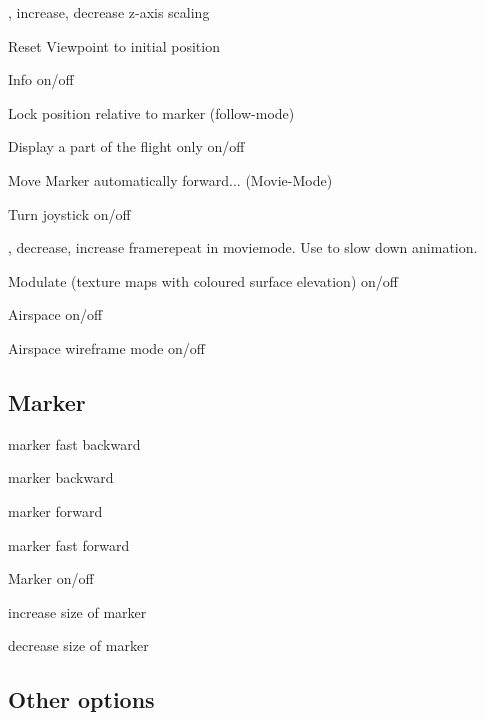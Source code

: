 \begin{hkkeys}
\item[\keys{{+}}, \keys{--}]      increase, decrease z-axis scaling

\item[\keys{F5}]       Reset Viewpoint to initial position
\item[\keys{F6}]       Info on/off

\item[\keys{M}]        Lock position relative to marker (follow-mode)
\item[\keys{U}]        Display a part of the flight only  on/off
\item[\keys{I}]        Move Marker automatically forward... (Movie-Mode)
\item[\keys{J}]        Turn joystick on/off

\item[\keys{\shift+F1}, \keys{\shift+F2}]
        decrease, increase framerepeat  in moviemode. Use to slow down animation.

\item[\keys{F8}]       Modulate (texture maps with coloured surface elevation) on/off
\item[\keys{F9}]       Airspace on/off
\item[\keys{\shift+F9}] Airspace wireframe mode on/off
\end{hkkeys}


\subsection*{Marker}

\begin{hkkeys}
\item[\keys{F1}]       marker fast backward
\item[\keys{F2}]       marker backward
\item[\keys{F3}]       marker forward
\item[\keys{F4}]       marker fast forward
\item[\keys{F7}]       Marker on/off
\item[\keys{page-up}]  increase size of marker
\item[\keys{page-down}] decrease size of marker
\end{hkkeys}


\subsection*{Other options}

